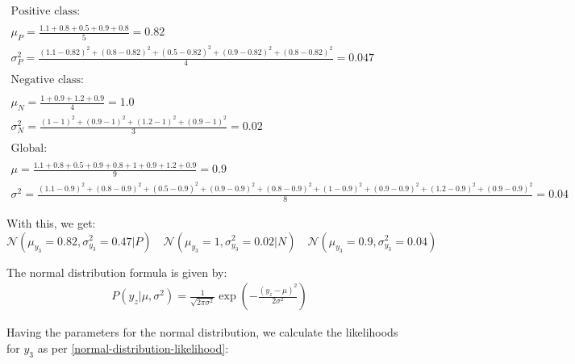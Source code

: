 \documentclass[12pt]{article}
\begin{document}
\begin{enumerate}[leftmargin=\labelsep]
    \vspace{10pt}
\[
\begin{array}{ll}
    \text{Positive class:} & \\
    \\
    \mu_P = \frac{1.1 + 0.8 + 0.5 + 0.9 + 0.8}{5} = 0.82 \\[10pt]
    \sigma_P^2 = \frac{(1.1 - 0.82)^2 + (0.8 - 0.82)^2 + (0.5 - 0.82)^2 + (0.9 - 0.82)^2 + (0.8 - 0.82)^2}{4} = 0.047 \\[10pt]
    \\
    \text{Negative class:} & \\
    \\
    \mu_N = \frac{1 + 0.9 + 1.2 + 0.9}{4} = 1.0 \\[10pt]
    \sigma_N^2 = \frac{(1 - 1)^2 + (0.9 - 1)^2 + (1.2 - 1)^2 + (0.9 - 1)^2}{3} = 0.02 \\[10pt]
    \\
    \text{Global:} & \\
    \\
    \mu = \frac{1.1 + 0.8 + 0.5 + 0.9 + 0.8 + 1 + 0.9 + 1.2 + 0.9}{9} = 0.9 \\[10pt]
    \sigma^2 = \frac{(1.1 - 0.9)^2 + (0.8 - 0.9)^2 + (0.5 - 0.9)^2 + (0.9 - 0.9)^2 + (0.8 - 0.9)^2 + (1 - 0.9)^2 + (0.9 - 0.9)^2 + (1.2 - 0.9)^2 + (0.9 - 0.9)^2}{8} = 0.04
\end{array}
\]


\vspace{10pt}
With this, we get:
\begin{equation*}
    \mathcal{N}(\mu_{y_3} = 0.82, \sigma_{y_3}^2 = 0.47|P) \quad \mathcal{N}(\mu_{y_3} = 1, \sigma_{y_3}^2 = 0.02|N) \quad \mathcal{N}(\mu_{y_3} = 0.9, \sigma_{y_3}^2 = 0.04)  
\end{equation*}

\vspace{10pt}
    The normal distribution formula is given by:
    \begin{equation}\label{normal-distribution-likelihood}
        \begin{aligned}
            P(y_z|\mu, \sigma^2) = \frac{1}{\sqrt{2\pi \sigma^2}} \exp\left(-\frac{(y_z - \mu)^2}{2\sigma^2}\right)
        \end{aligned}
    \end{equation}

    \newpage
    Having the parameters for the normal distribution, we calculate the likelihoods for $y_3$ as per \eqref{normal-distribution-likelihood}:
    

\end{enumerate}
\end{document}
